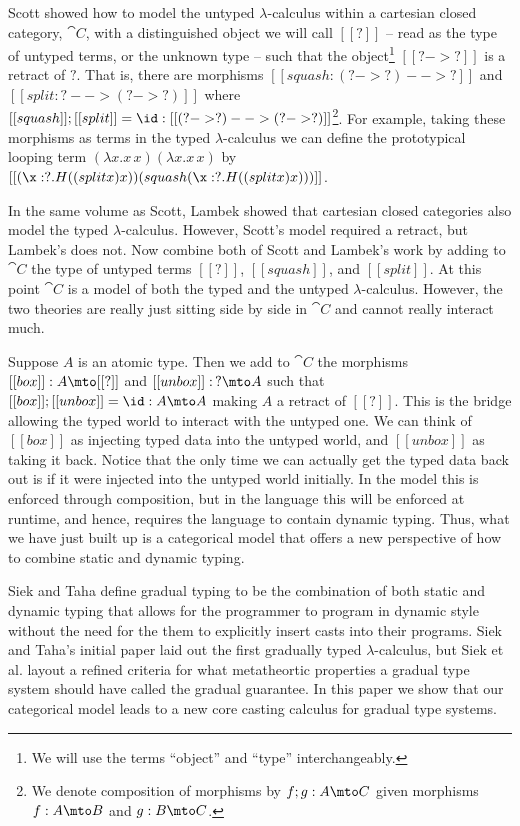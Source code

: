 Scott \cite{Scott:1980} showed how to model the untyped
$\lambda$-calculus within a cartesian closed category, $\cat{C}$, with
a distinguished object we will call $[[?]]$ -- read as the type of
untyped terms, or the unknown type -- such that the object\footnote{We
  will use the terms ``object'' and ``type'' interchangeably.} $[[?
    ->?]]$ is a retract of $?$.  That is, there are morphisms
$[[squash : (? -> ?)  --> ?]]$ and $[[split : ?  --> (? -> ?)]]$ where
$[[squash]];[[split]] = \id : [[(? -> ?)  --> (? -> ?)]]$\footnote{We
  denote composition of morphisms by $f;g : A \mto C$ given morphisms
  $f : A \mto B$ and $g : B \mto C$.}.  For example, taking these
morphisms as terms in the typed $\lambda$-calculus we can define the
prototypical looping term $(\lambda x.x\,x)(\lambda x.x\,x)$ by
$[[(\x:?.H((split x) x))(squash (\x:?.H((split x) x)))]]$.

In the same volume as Scott, Lambek \cite{Lambek:1980} showed that
cartesian closed categories also model the typed
$\lambda$-calculus. However, Scott's model required a retract, but
Lambek's does not.  Now combine both of Scott and Lambek's work by
adding to $\cat{C}$ the type of untyped terms $[[?]]$, $[[squash]]$,
and $[[split]]$. At this point $\cat{C}$ is a model of both the typed
and the untyped $\lambda$-calculus.  However, the two theories are
really just sitting side by side in $\cat{C}$ and cannot really
interact much.

Suppose $A$ is an atomic type.  Then we add to $\cat{C}$ the morphisms
$[[box]] : A \mto [[?]]$ and $[[unbox]] :\, ? \mto A$ such that
$[[box]];[[unbox]] = \id : A \mto A$ making $A$ a retract of $[[?]]$.
This is the bridge allowing the typed world to interact with the
untyped one.  We can think of $[[box]]$ as injecting typed data into
the untyped world, and $[[unbox]]$ as taking it back.  Notice that the
only time we can actually get the typed data back out is if it were
injected into the untyped world initially.  In the model this is
enforced through composition, but in the language this will be
enforced at runtime, and hence, requires the language to contain
dynamic typing.  Thus, what we have just built up is a categorical
model that offers a new perspective of how to combine static and
dynamic typing.

Siek and Taha \cite{Siek:2006} define gradual typing to be the
combination of both static and dynamic typing that allows for the
programmer to program in dynamic style without the need for the them
to explicitly insert casts into their programs.  Siek and Taha's
initial paper laid out the first gradually typed $\lambda$-calculus,
but Siek et al. \cite{Siek:2015} layout a refined criteria for what
metatheortic properties a gradual type system should have called the
gradual guarantee.  In this paper we show that our categorical model
leads to a new core casting calculus for gradual type systems.

